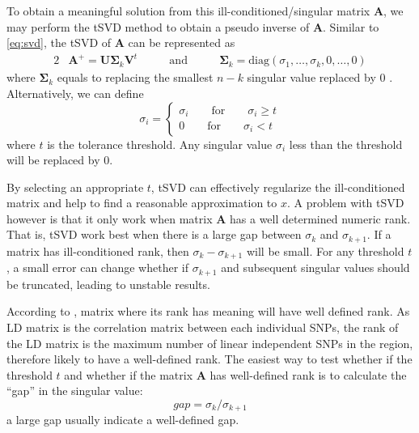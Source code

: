 			To obtain a meaningful solution from this ill-conditioned/singular matrix $\boldsymbol{A}$, we may perform the \gls{tSVD} method to obtain a pseudo inverse of $\boldsymbol{A}$.
			Similar to \cref{eq:svd}, the \gls{tSVD} of $\boldsymbol{A}$ can be represented as 
			\begin{alignat}{2}
				&\boldsymbol{A}^+ = \boldsymbol{U\Sigma}_k\boldsymbol{V}^t  &\qquad\text{and}\qquad  &\boldsymbol{\Sigma}_k=\mathrm{diag}(\sigma_1,\dots,\sigma_k,0,\dots,0)
				\label{eq:tsvd}				
			\end{alignat}
			where $\boldsymbol{\Sigma}_k$ equals to replacing the smallest $n-k$ singular value replaced by 0 \parencite{Hansen1987}. 
			Alternatively, we can define
			\begin{equation}
			\sigma_i=\begin{cases}
			\sigma_i\qquad\text{for}\qquad\sigma_i\ge t\\
			0\qquad\text{for}\qquad\sigma_i<t
			\end{cases}
			\end{equation}
			where $t$ is the tolerance threshold. 
			Any singular value $\sigma_i$ less than the threshold will be replaced by 0. 
			
			By selecting an appropriate $t$, \gls{tSVD} can effectively regularize the ill-conditioned matrix and help to find a reasonable approximation to $x$. 
			A problem with \gls{tSVD} however is that it only work when matrix $\boldsymbol{A}$ has a well determined numeric rank\parencite{Hansen1987}.
			That is, \gls{tSVD} work best when there is a large gap between $\sigma_k$ and $\sigma_{k+1}$.
			If a matrix has ill-conditioned rank, then $\sigma_k-\sigma_{k+1}$ will be small.
			For any threshold $t$, a small error can change whether if $\sigma_{k+1}$ and subsequent singular values should be truncated, leading to unstable results. 
			
			According to \citet{Hansen1987}, matrix where its rank has meaning will have well defined rank. 
			As \gls{LD} matrix is the correlation matrix between each individual \glspl{SNP}, the rank of the \gls{LD} matrix is the maximum number of linear independent \glspl{SNP} in the region, therefore likely to have a well-defined rank. 
			The easiest way to test whether if the threshold $t$ and whether if the matrix $\boldsymbol{A}$ has well-defined rank is to calculate the ``gap'' in the singular value:
			\begin{equation}
			gap = \sigma_k/\sigma_{k+1}
			\label{eq:gapSingular}
			\end{equation}
			a large gap usually indicate a well-defined gap. 
			
